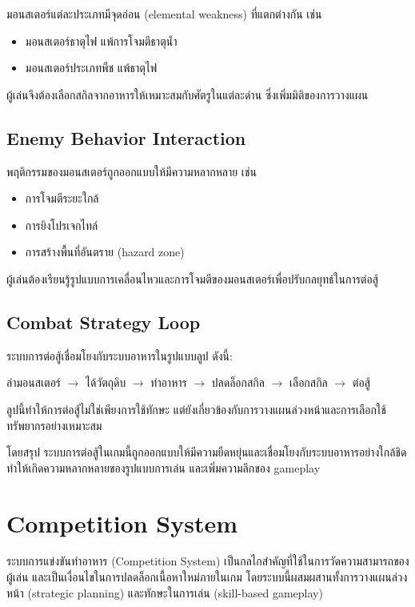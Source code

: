 มอนสเตอร์แต่ละประเภทมีจุดอ่อน (elemental weakness) ที่แตกต่างกัน เช่น

\begin{itemize}
\item มอนสเตอร์ธาตุไฟ แพ้การโจมตีธาตุน้ำ
\item มอนสเตอร์ประเภทพืช แพ้ธาตุไฟ
\end{itemize}

ผู้เล่นจึงต้องเลือกสกิลจากอาหารให้เหมาะสมกับศัตรูในแต่ละด่าน ซึ่งเพิ่มมิติของการวางแผน

\subsection{Enemy Behavior Interaction}

พฤติกรรมของมอนสเตอร์ถูกออกแบบให้มีความหลากหลาย เช่น

\begin{itemize}
\item การโจมตีระยะใกล้
\item การยิงโปรเจกไทล์
\item การสร้างพื้นที่อันตราย (hazard zone)
\end{itemize}

ผู้เล่นต้องเรียนรู้รูปแบบการเคลื่อนไหวและการโจมตีของมอนสเตอร์เพื่อปรับกลยุทธ์ในการต่อสู้

\subsection{Combat Strategy Loop}

ระบบการต่อสู้เชื่อมโยงกับระบบอาหารในรูปแบบลูป ดังนี้:

ล่ามอนสเตอร์ $\rightarrow$ ได้วัตถุดิบ $\rightarrow$ ทำอาหาร $\rightarrow$ ปลดล็อกสกิล $\rightarrow$ เลือกสกิล $\rightarrow$ ต่อสู้
\par\vspace{0.5em}\noindent
ลูปนี้ทำให้การต่อสู้ไม่ใช่เพียงการใช้ทักษะ แต่ยังเกี่ยวข้องกับการวางแผนล่วงหน้าและการเลือกใช้ทรัพยากรอย่างเหมาะสม
\par\vspace{0.5em}\noindent
โดยสรุป ระบบการต่อสู้ในเกมนี้ถูกออกแบบให้มีความยืดหยุ่นและเชื่อมโยงกับระบบอาหารอย่างใกล้ชิด ทำให้เกิดความหลากหลายของรูปแบบการเล่น และเพิ่มความลึกของ gameplay

\section{Competition System}

ระบบการแข่งขันทำอาหาร (Competition System) เป็นกลไกสำคัญที่ใช้ในการวัดความสามารถของผู้เล่น และเป็นเงื่อนไขในการปลดล็อกเนื้อหาใหม่ภายในเกม โดยระบบนี้ผสมผสานทั้งการวางแผนล่วงหน้า (strategic planning) และทักษะในการเล่น (skill-based gameplay)

